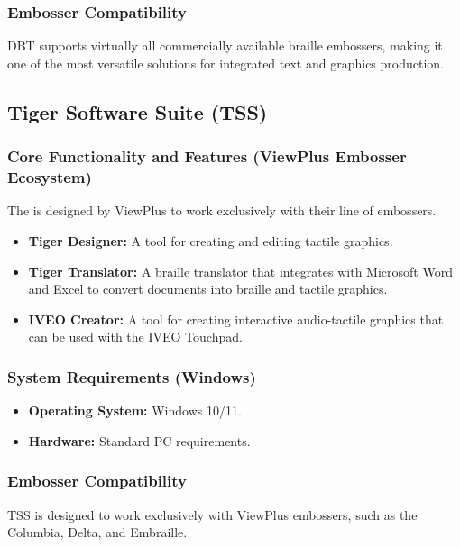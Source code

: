 \subsubsection{Embosser Compatibility}\label{ch14:sssec:dbt-compat}
DBT supports virtually all commercially available braille embossers, making it one of the most versatile solutions for integrated text and graphics production.

\subsection{Tiger Software Suite (TSS)}\label{ch14:ssec:tss}
\subsubsection{Core Functionality and Features (ViewPlus Embosser Ecosystem)}\label{ch14:sssec:tss-features}
The  is designed by ViewPlus to work exclusively with their line of embossers.
\begin{itemize}
	\item \textbf{Tiger Designer:} A tool for creating and editing tactile graphics.
	\item \textbf{Tiger Translator:} A braille translator that integrates with Microsoft Word and Excel to convert documents into braille and tactile graphics.
	\item \textbf{IVEO Creator:} A tool for creating interactive audio-tactile graphics that can be used with the IVEO Touchpad.
\end{itemize}

\subsubsection{System Requirements (Windows)}\label{ch14:sssec:tss-sysreq}
\begin{itemize}
	\item \textbf{Operating System:} Windows 10/11.
	\item \textbf{Hardware:} Standard PC requirements.
\end{itemize}

\subsubsection{Embosser Compatibility}\label{ch14:sssec:tss-compat}
TSS is designed to work exclusively with ViewPlus embossers, such as the Columbia, Delta, and Embraille.

